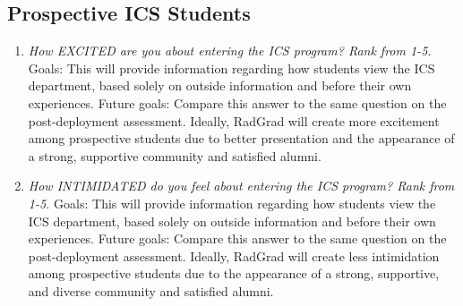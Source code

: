 \subsection{Prospective ICS Students}
\begin{enumerate}
\item\textit{ How EXCITED are you about entering the ICS program? Rank from 1-5.}
Goals: This will provide information regarding how students view the ICS department, based solely on outside information and before their own experiences. 
Future goals: Compare this answer to the same question on the post-deployment assessment. Ideally, RadGrad will create more excitement among prospective students due to better presentation and the appearance of a strong, supportive community and satisfied alumni.
\item \textit{How INTIMIDATED do you feel about entering the ICS program? Rank from 1-5.}
Goals: This will provide information regarding how students view the ICS department, based solely on outside information and before their own experiences.
Future goals: Compare this answer to the same question on the post-deployment assessment. Ideally, RadGrad will create less intimidation among prospective students due to the appearance of a strong, supportive, and diverse community and satisfied alumni. 
\end{enumerate}

